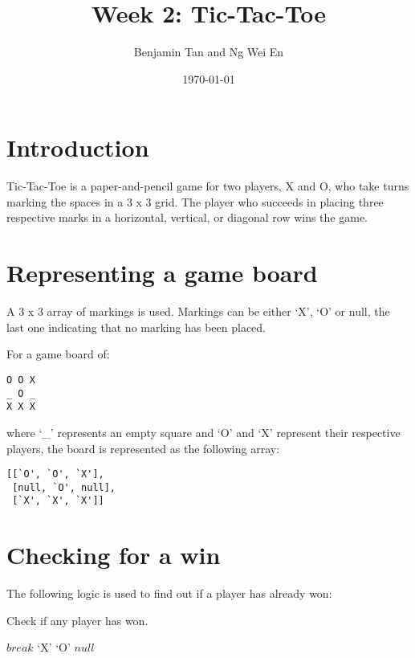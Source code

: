 \documentclass{article}
\title{Week 2: Tic-Tac-Toe}
\author{Benjamin Tan and Ng Wei En}
\date{\today}
\newcommand{\qt}[1]{\mbox{`#1'}}
\begin{document}
\maketitle

\section{Introduction}

Tic-Tac-Toe is a paper-and-pencil game for two players, X and O, who take turns marking the spaces in a 3 x 3 grid. The player who succeeds in placing three respective marks in a horizontal, vertical, or diagonal row wins the game.

\section{Representing a game board}

A 3 x 3 array of markings is used. Markings can be either `X', `O' or null, the last one indicating that no marking has been placed.

For a game board of:

\begin{verbatim}
O O X
_ O _
X X X
\end{verbatim}

where `\_' represents an empty square and `O' and `X' represent their respective players, the board is represented as the following array:

\begin{verbatim}
[[`O', `O', `X'],
 [null, `O', null],
 [`X', `X', `X']]
\end{verbatim}

\section{Checking for a win}

The following logic is used to find out if a player has already won:

\begin{algorithm}
\caption{Check if any player has won.}

\begin{algorithmic}[1]
        $break$
      \EndIf
    \EndFor
    \If{$seq[0] = \qt{X}$}
      \Return $\qt{X}$
    \ElsIf{$seq[0] = \qt{O}$}
      \Return $\qt{O}$
    \EndIf
  \EndFor
  \Return $null$
\EndProcedure
\end{algorithmic}
\end{algorithm}
\end{document}
